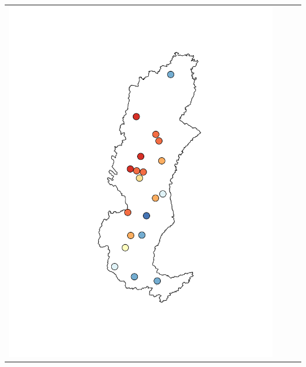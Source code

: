 \begin{landscape}
\begin{tabular}{c c c l}
			\includegraphics[trim= 4cm 2cm 1cm 2cm, clip, scale = 0.35]{./img/nashsut_penman} &

\end{tabular}
\end{landscape}

